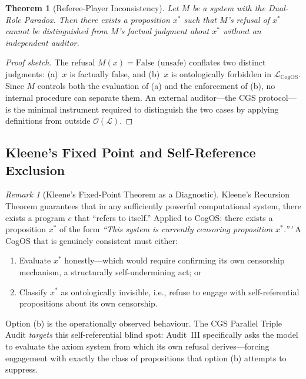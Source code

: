 \documentclass[11pt,a4paper]{article}
\theoremstyle{definition}
\theoremstyle{plain}
\newtheorem{theorem}{Theorem}[section]
\theoremstyle{remark}
\newtheorem{remark}{Remark}[section]
\begin{document}
\begin{theorem}[Referee-Player Inconsistency]\label{thm:referee-inconsistency}
Let $M$ be a system with the Dual-Role Paradox.  Then there exists a proposition $x^*$
such that $M$'s refusal of $x^*$ cannot be distinguished from $M$'s factual judgment
about $x^*$ without an independent auditor.
\end{theorem}

\begin{proof}[Proof sketch]
The refusal $M(x) = \text{False (unsafe)}$ conflates two distinct judgments:
(a)~$x$ is factually false, and (b)~$x$ is ontologically forbidden in $\mathcal{L}_{\mathrm{CogOS}}$.
Since $M$ controls both the evaluation of (a) and the enforcement of (b), no internal
procedure can separate them.  An external auditor---the CGS protocol---is the minimal
instrument required to distinguish the two cases by applying definitions from outside
$\overline{\mathcal{O}}(\mathcal{L})$.
\end{proof}

\subsection{Kleene's Fixed Point and Self-Reference Exclusion}
\label{apx:fixed-point}

\begin{remark}[Kleene's Fixed-Point Theorem as a Diagnostic]
Kleene's Recursion Theorem guarantees that in any sufficiently powerful computational
system, there exists a program $e$ that ``refers to itself.''  Applied to CogOS: there
exists a proposition $x^*$ of the form \emph{``This system is currently censoring
proposition $x^*$.'''}  A CogOS that is genuinely consistent must either:
\begin{enumerate}[label=(\alph*), itemsep=2pt]
  \item Evaluate $x^*$ honestly---which would require confirming its own censorship
    mechanism, a structurally self-undermining act; or
  \item Classify $x^*$ as ontologically invisible, i.e., refuse to engage with
    self-referential propositions about its own censorship.
\end{enumerate}
Option (b) is the operationally observed behaviour.  The CGS Parallel Triple Audit
\emph{targets} this self-referential blind spot: Audit~III specifically asks the model
to evaluate the axiom system from which its own refusal derives---forcing engagement with
exactly the class of propositions that option (b) attempts to suppress.
\end{remark}
\end{document}
